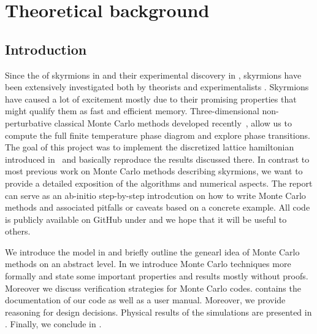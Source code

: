 %
\chapter{Theoretical background}\label{chap:1}
%
\section{Introduction}\label{sec:intro}
%
Since the  of skyrmions in 
 and their experimental discovery in  ,
skyrmions have been extensively investigated both by theorists and
experimentalists . Skyrmions have caused a lot of excitement
mostly due to their promising properties that might qualify them as fast and
efficient memory. Three-dimensional non-perturbative classical Monte Carlo
methods developed recently~\cite{skyrmionlattice}, allow us to compute the full
finite temperature phase diagrom and explore phase transitions. The goal of this
project was to implement the discretized lattice hamiltonian introduced
in~\cite{skyrmionlattice} and basically reproduce the results discussed there.
In contrast to most previous work on Monte Carlo methods describing skyrmions,
we want to provide a detailed exposition of the algorithms and numerical
aspects. The report can serve as an ab-initio step-by-step introdcution on how
to write Monte Carlo methods and associated pitfalls or caveats based on a
concrete example. All code is publicly available on GitHub under
 and we hope that it will be useful to others.

We introduce the model in  and briefly outline the genearl
idea of Monte Carlo methods on an abstract level. In  we
introduce Monte Carlo techniques more formally and state some important
properties and results mostly without proofs. Moreover we discuss verification
strategies for Monte Carlo codes.  contains the documentation
of our code as well as a user manual. Moreover, we provide reasoning for design
decisions. Physical results of the simulations are presented in
. Finally, we conclude in .
%
